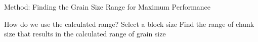 \documentclass[10pt]{beamer}
\begin{document}

\begin{frame}{Method: Finding the Grain Size Range for Maximum Performance}
	\begin{outline}
	How do we use the calculated range?
	\1Select a block size
	\1Find the range of chunk size that results in the calculated range of grain size
	\end{outline}
\end{frame}
\end{document}
